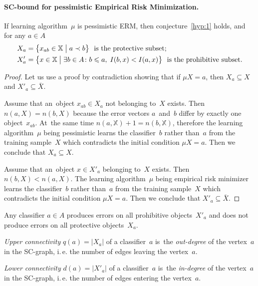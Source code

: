 \documentclass{article}
\def\XX{\mathbb{X}}
\newcommand{\X}{\bar X}
\renewcommand{\leq}{\leqslant}
\renewcommand{\emph}[1]{\textit{#1}}
\begin{document}
\paragraph{SC-bound for pessimistic Empirical Risk Minimization.}
\begin{lemma}
\label{lem:pERM}
    If learning algorithm~$\mu$ is pessimistic ERM,
    then conjecture~\ref{hyp:1} holds,
    and for any $a\in A$
    \begin{align*}
        X _a &= \bigl\{ x_{ab}\in\XX \bigm| a\prec b\bigr\}
                \text{~ is the protective subset};\\
        X'_a &= \bigl\{ x\in\XX \bigm| \exists b\in A\colon b\leq a,\; I(b,x)<I(a,x) \bigr\}
                \text{~ is the prohibitive subset}.
    \end{align*}
\end{lemma}
\begin{proof}
    Let us use a proof by contradiction showing that
    if $\mu X = a$, then $X_a\subseteq X$ and $X'_a\subseteq \X$.

    Assume that an~object $x_{ab}\in X_a$ not belonging to~$X$ exists.
    Then ${n(a,X) = n(b,X)}$ because the
    error vectors $a$~and~$b$ differ by exactly one object~$x_{ab}$.
    At~the same time  $n(a,\XX)+1 = n(b,\XX)$,
    therefore the learning algorithm~$\mu$ being pessimistic
    learns the classifier~$b$ rather than~$a$ from the training sample~$X$
    which contradicts the initial condition ${\mu X = a}$.
    Then we conclude that $X_a \subseteq X$.

    Assume that an~object $x\in X'_a$ belonging to~$X$ exists.
    Then ${n(b,X) < n(a,X)}$.
    The learning algorithm~$\mu$ being empirical risk minimizer
    learns the classifier~$b$ rather than~$a$ from the training sample~$X$
    which contradicts the initial condition ${\mu X = a}$.
    Then we conclude that $X'_a \subseteq \X$.
\end{proof}

\begin{corollary}
\label{lem:pERM:corollary}
    Any classifier $a\in A$
    produces errors on all prohibitive objects~$X'_a$ and
    does not produce errors on all protective objects~$X_a$.
\end{corollary}

\emph{Upper connectivity} $q(a)=|X_a|$ of a classifier~$a$
is~the \emph{out-degree} of the vertex~$a$ in the SC-graph,
i.\,e. the number of edges leaving the vertex~$a$.

\medskip
\emph{Lower connectivity} $d(a)=|X'_a|$ of a classifier~$a$
is~the \emph{in-degree}  of the vertex~$a$ in the SC-graph,
i.\,e. the number of edges entering the vertex~$a$.
\end{document}

